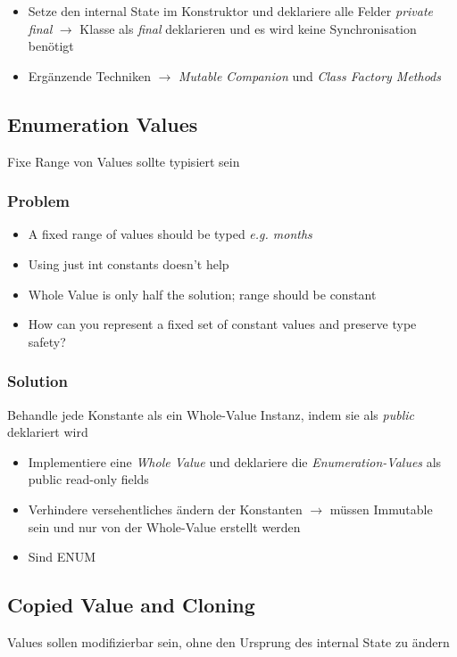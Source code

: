 \begin{itemize}
    \item Setze den internal State im Konstruktor und deklariere alle Felder \textit{private final} $\rightarrow$ Klasse als \textit{final} deklarieren und es wird keine Synchronisation benötigt
    \item Ergänzende Techniken $\rightarrow$ \textit{Mutable Companion} und \textit{Class Factory Methods}
\end{itemize}

\subsection{Enumeration Values}
Fixe Range von Values sollte typisiert sein

\subsubsection{Problem}
\begin{itemize}
    \item A fixed range of values should be typed \textit{e.g. months}
    \item Using just int constants doesn't help
    \item Whole Value is only half the solution; range should be constant
    \item How can you represent a fixed set of constant values and preserve type safety?
\end{itemize}
\subsubsection{Solution}
Behandle jede Konstante als ein Whole-Value Instanz, indem sie als \textit{public} deklariert wird
\begin{itemize}
    \item Implementiere eine \textit{Whole Value} und deklariere die \textit{Enumeration-Values} als public read-only fields
    \item Verhindere versehentliches ändern der Konstanten $\rightarrow$ müssen Immutable sein und nur von der Whole-Value erstellt werden
    \item Sind ENUM
\end{itemize}

\vfill\null
\columnbreak

\subsection{Copied Value and Cloning}
Values sollen modifizierbar sein, ohne den Ursprung des internal State zu ändern
